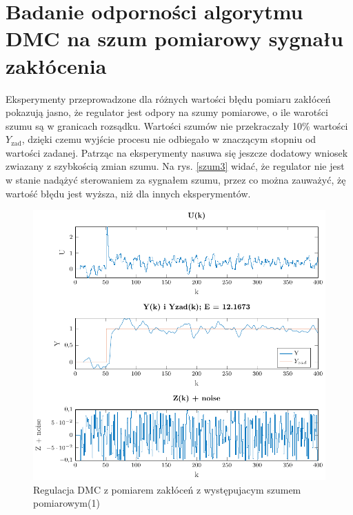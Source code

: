 \documentclass[a4paper,titlepage,11pt,twosides,floatssmall]{mwrep}
\begin{document}
\section{Badanie odporności algorytmu DMC na szum pomiarowy sygnału zakłócenia}
Eksperymenty przeprowadzone dla różnych wartości błędu pomiaru zakłóceń pokazują jasno, że regulator jest odpory na szumy pomiarowe, o ile warotści szumu są w granicach rozsądku. Wartości szumów nie przekraczały 10\% wartości $Y_{\mathrm{zad}}$, dzięki czemu wyjście procesu nie odbiegało w znaczącym stopniu od wartości zadanej. Patrząc na eksperymenty nasuwa się jeszcze dodatowy wniosek zwiazany z szybkością zmian szumu. Na rys. \ref{szum3} widać, że regulator nie jest w stanie nadążyć sterowaniem za sygnałem szumu, przez co można zauważyć, żę wartość błędu jest wyższa, niż dla innych eksperymentów.

\begin{figure}[H]
	\centering
	\includegraphics[scale=0.85]{../../Lab2/PDF_rysunki/Z7_Szum1.pdf}
	\caption{Regulacja DMC z pomiarem zakłóceń z występujacym szumem pomiarowym(1)}
	\label{szum1}
\end{figure}
\end{document}
